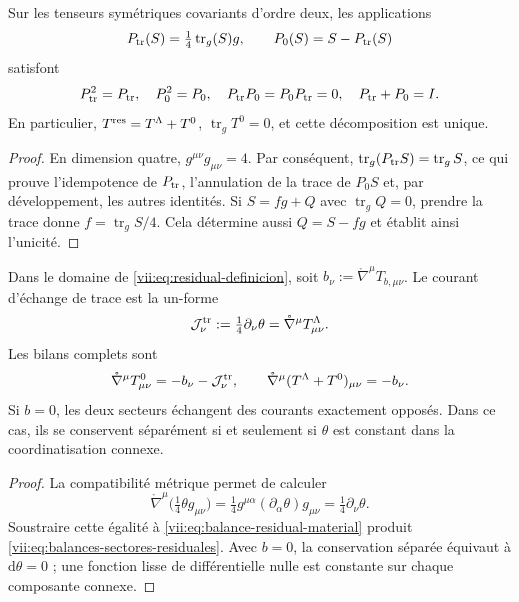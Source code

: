 \begin{proposition}
\label{vii:prop:proyectores-traza-residual}
Sur les tenseurs symétriques covariants d'ordre deux, les applications
\[
 P_{\rm tr}(S)=\tfrac14\operatorname{tr}_g(S)g,
 \qquad P_0(S)=S-P_{\rm tr}(S)
\]
satisfont
\begin{equation}
 P_{\rm tr}^2=P_{\rm tr},\quad P_0^2=P_0,\quad
 P_{\rm tr}P_0=P_0P_{\rm tr}=0,\quad P_{\rm tr}+P_0=I.
 \label{vii:eq:proyectores-traza-residual}
\end{equation}
En particulier, \(T^{\rm res}=T^\Lambda+T^0\), \(\operatorname{tr}_gT^0=0\), et cette décomposition est unique.
\end{proposition}
\begin{proof}
En dimension quatre, \(g^{\mu\nu}g_{\mu\nu}=4\). Par conséquent,
\(\operatorname{tr}_g(P_{\rm tr}S)=\operatorname{tr}_gS\), ce qui
prouve l'idempotence de \(P_{\rm tr}\), l'annulation de la trace
de \(P_0S\) et, par développement, les autres identités.
Si \(S=fg+Q\) avec \(\operatorname{tr}_gQ=0\), prendre la trace
donne \(f=\operatorname{tr}_gS/4\). Cela détermine aussi
\(Q=S-fg\) et établit ainsi l'unicité.
\end{proof}

\begin{theorem}
\label{vii:thm:intercambio-traza-residual}
Dans le domaine de \eqref{vii:eq:residual-definicion}, soit
\(b_\nu:=\mathring\nabla^\mu T_{b,\mu\nu}\). Le courant
d'échange de trace est la un-forme
\begin{equation}
 \mathcal J^{\rm tr}_\nu
 :=\tfrac14\partial_\nu\theta
 =\mathring\nabla^\mu T^\Lambda_{\mu\nu}.
 \label{vii:eq:corriente-intercambio-traza}
\end{equation}
Les bilans complets sont
\begin{equation}
 \mathring\nabla^\mu T^0_{\mu\nu}
       =-b_\nu-\mathcal J^{\rm tr}_\nu,
 \qquad
 \mathring\nabla^\mu(T^\Lambda+T^0)_{\mu\nu}=-b_\nu.
 \label{vii:eq:balances-sectores-residuales}
\end{equation}
Si \(b=0\), les deux secteurs échangent des courants exactement opposés. Dans ce cas, ils se conservent séparément si et seulement si \(\theta\) est constant dans la coordinatisation connexe.
\end{theorem}
\begin{proof}
La compatibilité métrique permet de calculer
\[
 \mathring\nabla^\mu\bigl(\tfrac14\theta g_{\mu\nu}\bigr)
 =\tfrac14g^{\mu\alpha}(\partial_\alpha\theta)g_{\mu\nu}
 =\tfrac14\partial_\nu\theta.
\]
Soustraire cette égalité à \eqref{vii:eq:balance-residual-material} produit
\eqref{vii:eq:balances-sectores-residuales}. Avec \(b=0\), la
conservation séparée équivaut à \(\mathrm d\theta=0\) ; une fonction
lisse de différentielle nulle est constante sur chaque composante connexe.
\end{proof}

